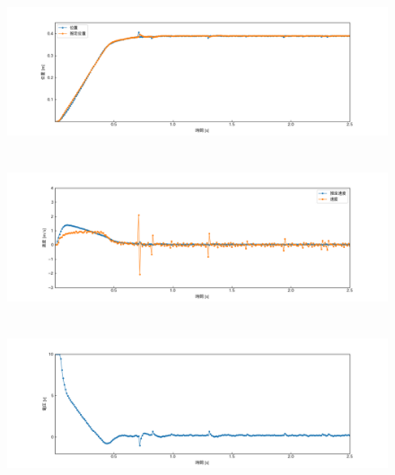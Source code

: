 \documentclass[12pt]{jsarticle}
\begin{document}
\begin{figure}[H]
  \begin{center}
    \includegraphics[clip,width=13.0cm, height=4.4cm]{../img/Exp3-1.png}
    \caption{}
    \label{Exp3-1}
  \end{center}
\end{figure}
\begin{figure}[H]
  \begin{center}
    \includegraphics[clip,width=13.0cm, height=4.4cm]{../img/Exp3-2.png}
    \caption{}
    \label{Exp3-2}
  \end{center}
\end{figure}
\begin{figure}[H]
  \begin{center}
    \includegraphics[clip,width=13.0cm, height=4.4cm]{../img/Exp3-3.png}
    \caption{}
    \label{Exp3-3}
  \end{center}
\end{figure}
\end{document}
